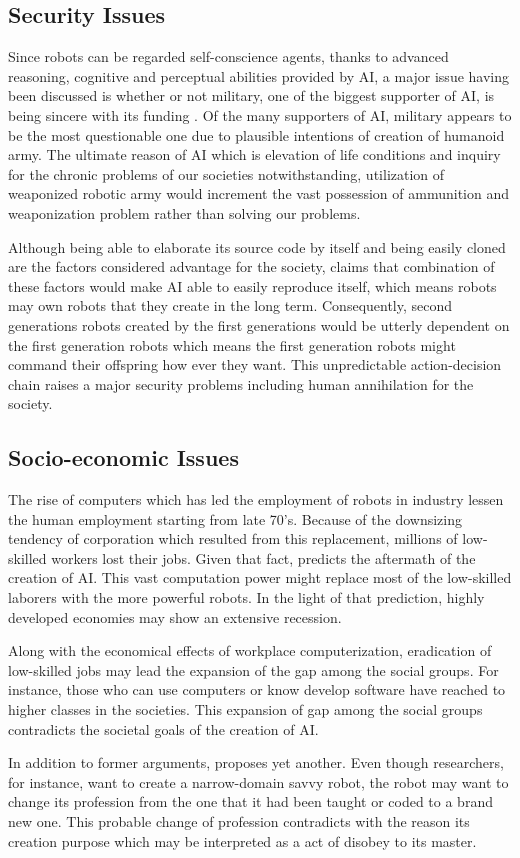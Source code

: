 \documentclass[man]{apa6}
\begin{document}
\subsection{Security Issues}
Since robots can be regarded self-conscience agents, thanks to advanced reasoning, cognitive and perceptual abilities provided by AI, a major issue having been discussed is whether or not military, one of the biggest supporter of AI, is being sincere with its funding \cite{gre}. Of the many supporters of AI, military appears to be the most questionable one due to plausible intentions of creation of humanoid army. The ultimate reason of AI which is elevation of life conditions and inquiry for the chronic problems of our societies notwithstanding, utilization of weaponized robotic army would increment the vast possession of ammunition and weaponization problem rather than solving our problems.\par
Although being able to elaborate its source code by itself and being easily cloned are the factors considered advantage for the society,  claims that combination of these factors would make AI able to easily reproduce itself, which means robots may own robots that they create in the long term. Consequently, second generations robots created by the first generations would be utterly
dependent on the first generation robots which means the first generation robots might command their offspring how ever they want. This unpredictable action-decision chain raises a major security problems including human annihilation for the society. 
\subsection{Socio-economic Issues}
The rise of computers which has led the employment of robots in industry lessen the human employment starting from late 70's. Because of the downsizing tendency of corporation which resulted from this replacement, millions of low-skilled workers lost their jobs. Given that fact,  predicts the aftermath of the creation of AI. This vast computation power might replace most of the low-skilled laborers with the more powerful robots. In the light of that prediction, highly developed economies may show an extensive recession.\par
Along with the economical effects of workplace computerization, eradication of low-skilled jobs may lead the expansion of the gap among the social groups. For instance, those who can use computers or know develop software have reached to higher classes in the societies. This expansion of gap among the social groups contradicts the societal goals of the creation of AI.\par
In addition to former arguments,  proposes yet another. Even though researchers, for instance, want to create a narrow-domain savvy robot, the robot may want to change its profession
from the one that it had been taught or coded to a brand new one. This probable change of profession contradicts with the reason its creation purpose which may be interpreted as a act of disobey to its master.
\end{document}
